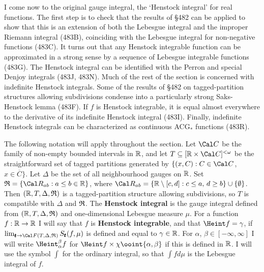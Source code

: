 
\def\chaptername{Gauge integrals}
\def\sectionname{The Henstock integral}
\def\FSH{F^{_{\text{SH}}}}


I come now to the original gauge integral, the `Henstock integral' for
real functions.   The first step is to check that the results of \S482
can be applied to show that this is an extension of both the Lebesgue
integral and the improper Riemann integral (483B), coinciding with
the Lebesgue integral for non-negative functions (483C).   It turns out
that any Henstock integrable function can be approximated in a strong
sense by a sequence of Lebesgue integrable functions (483G).   The
Henstock integral can be identified with the Perron and special Denjoy
integrals (483J, 483N).
Much of the rest of the section is concerned
with indefinite Henstock integrals.   Some of the results of \S482 on
tagged-partition structures allowing subdivisions condense into a
particularly strong Saks-Henstock lemma (483F).   If $f$ is Henstock
integrable, it is equal almost everywhere to the derivative of its
indefinite Henstock integral (483I).   
Finally, indefinite Henstock integrals can be characterized as 
continuous ACG$_*$ functions (483R).

 The following notation will apply throughout
the section.   Let $\Cal C$ be the family of non-empty bounded intervals
in $\Bbb R$, and let
$T\subseteq[\Bbb R\times\Cal C]^{<\omega}$ be the straightforward set of
tagged partitions generated by
$\{(x,C):C\in\Cal C$, $x\in\overline{C}\}$.   Let $\Delta$ be the set of
all neighbourhood gauges on $\Bbb R$.    Set
$\frak R=\{\Cal R_{ab}:a\le b\in\Bbb R\}$, where
$\Cal R_{ab}=\{\Bbb R\setminus[c,d]:c\le a,\,d\ge b\}\cup\{\emptyset\}$.
Then $(\Bbb R,T,\Delta,\frak R)$ is a tagged-partition structure
allowing subdivisions, so $T$ is compatible with
$\Delta$ and $\frak R$.   The {\bf Henstock integral}
is the gauge integral defined from
$(\Bbb R,T,\Delta,\frak R)$ and one-dimensional
Lebesgue measure $\mu$.   For a function
$f:\Bbb R\to\Bbb R$ I will say that $f$ is {\bf Henstock integrable},
and that $\Heint f=\gamma$, if
$\lim_{\pmb{t}\to\Cal F(T,\Delta,\frak R)}S_{\pmb{t}}(f,\mu)$ is defined
and equal to $\gamma\in\Bbb R$.   For $\alpha$,
$\beta\in[-\infty,\infty]$ I will write $\Heint_{\alpha}^{\beta}f$ for
$\Heint f\times\chi\ooint{\alpha,\beta}$ if this is defined in $\Bbb R$.
I will use the symbol $\int$ for the ordinary integral, so that
$\int fd\mu$ is the Lebesgue integral of $f$.

